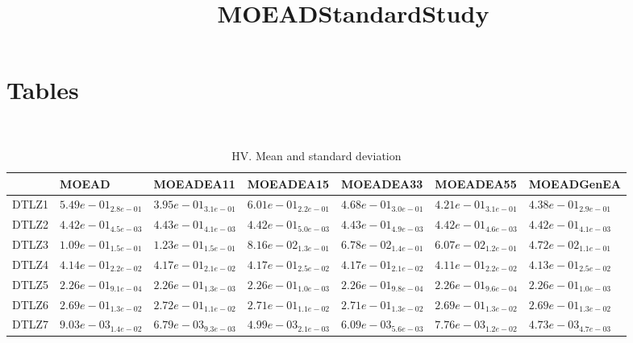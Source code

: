 \documentclass{article}
\title{MOEADStandardStudy}
\author{}
\begin{document}
\maketitle
\section{Tables}
\
\begin{table}
\caption{HV. Mean and standard deviation}
\label{table:mean.HV}
\centering
\begin{scriptsize}
\begin{tabular}{lllllll}
\hline & MOEAD & MOEADEA11 & MOEADEA15 & MOEADEA33 & MOEADEA55 &  MOEADGenEA\\
\hline
DTLZ1 & \cellcolor{gray25}$  5.49e-01_{ 2.8e-01}$ & $  3.95e-01_{ 3.1e-01}$ & \cellcolor{gray95}$  6.01e-01_{ 2.2e-01}$ & $  4.68e-01_{ 3.0e-01}$ & $  4.21e-01_{ 3.1e-01}$ & $  4.38e-01_{ 2.9e-01}$ \\
DTLZ2 & $  4.42e-01_{ 4.5e-03}$ & \cellcolor{gray25}$  4.43e-01_{ 4.1e-03}$ & $  4.42e-01_{ 5.0e-03}$ & \cellcolor{gray95}$  4.43e-01_{ 4.9e-03}$ & $  4.42e-01_{ 4.6e-03}$ & $  4.42e-01_{ 4.1e-03}$ \\
DTLZ3 & \cellcolor{gray25}$  1.09e-01_{ 1.5e-01}$ & \cellcolor{gray95}$  1.23e-01_{ 1.5e-01}$ & $  8.16e-02_{ 1.3e-01}$ & $  6.78e-02_{ 1.4e-01}$ & $  6.07e-02_{ 1.2e-01}$ & $  4.72e-02_{ 1.1e-01}$ \\
DTLZ4 & $  4.14e-01_{ 2.2e-02}$ & \cellcolor{gray95}$  4.17e-01_{ 2.1e-02}$ & \cellcolor{gray25}$  4.17e-01_{ 2.5e-02}$ & $  4.17e-01_{ 2.1e-02}$ & $  4.11e-01_{ 2.2e-02}$ & $  4.13e-01_{ 2.5e-02}$ \\
DTLZ5 & $  2.26e-01_{ 9.1e-04}$ & $  2.26e-01_{ 1.3e-03}$ & $  2.26e-01_{ 1.0e-03}$ & $  2.26e-01_{ 9.8e-04}$ & \cellcolor{gray95}$  2.26e-01_{ 9.6e-04}$ & $  2.26e-01_{ 1.0e-03}$ \\
DTLZ6 & $  2.69e-01_{ 1.3e-02}$ & \cellcolor{gray95}$  2.72e-01_{ 1.1e-02}$ & \cellcolor{gray25}$  2.71e-01_{ 1.1e-02}$ & $  2.71e-01_{ 1.3e-02}$ & $  2.69e-01_{ 1.3e-02}$ & $  2.69e-01_{ 1.3e-02}$ \\
DTLZ7 & \cellcolor{gray95}$  9.03e-03_{ 1.4e-02}$ & $  6.79e-03_{ 9.3e-03}$ & $  4.99e-03_{ 2.1e-03}$ & $  6.09e-03_{ 5.6e-03}$ & \cellcolor{gray25}$  7.76e-03_{ 1.2e-02}$ & $  4.73e-03_{ 4.7e-03}$ \\
\hline
\end{tabular}
\end{scriptsize}
\end{table}
\
\end{document}
